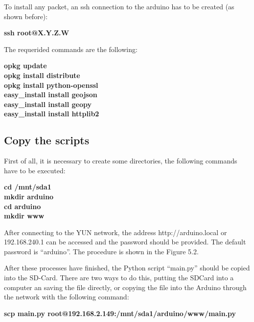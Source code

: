 \documentclass[12pt, a4paper,twoside]{tesi_upf}
\begin{document}
    To install any packet, an ssh connection to the arduino has to be created (as shown before):
    
    {\begin{centering} \textbf{ssh root@X.Y.Z.W}\par \end{centering}}
    
    The requerided commands are the following:
     
      {\begin{centering} \textbf{
          opkg update \\
          opkg install distribute \\
          opkg install python-openssl \\
          easy\_install install geojson \\
          easy\_install install geopy \\
          easy\_install install httplib2
        }
      \par \end{centering}}
    
  \subsection{Copy the scripts}
    First of all, it is necessary to create some directories, the following commands have to be executed:
    
    {\begin{centering} \textbf{
    cd /mnt/sda1 \\
    mkdir arduino \\
    cd arduino \\
    mkdir www \\
    }\par \end{centering}}
    
    After connecting to the YUN network, the address http://arduino.local or 192.168.240.1 can be accessed and the password should be provided. The default password is “arduino”. The procedure is shown in the Figure 5.2.
    
    After these processes have finished, the Python script ``main.py'' should be copied into the SD-Card. There are two ways to do this, putting the SDCard into a computer an saving the file directly, or copying the file into the Arduino through the network with the following command:
    
    {\begin{centering} \textbf{
    scp main.py root@192.168.2.149:/mnt/sda1/arduino/www/main.py
    }\par \end{centering}}
  
\end{document}
